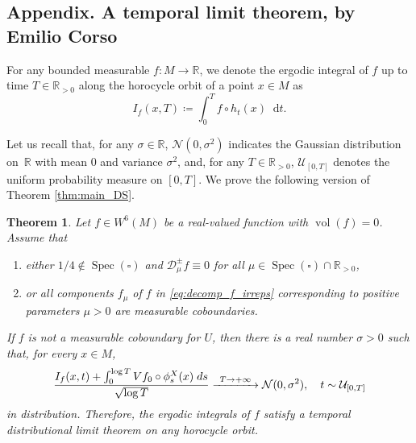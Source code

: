\documentclass[11pt]{article}
\newenvironment{enumeratea}
{\bgroup\def\theenumi{\alph{enumi}}\begin{enumerate}}
{\end{enumerate}\egroup}
\newcommand\To[1]{\mathchoice{\xrightarrow{\kern4pt#1\kern3pt}}{\stackrel{#1}{\longrightarrow}}{}{}}
\newcommand \R{\mathbb{R}}
\newcommand {\cN}{\mathcal{N}}
\newcommand*{\diff}{\mathop{}\!\mathrm{d}}
\newcommand{\Dpm}[1]{\mathcal{D}_\mu^{\pm} #1}
\DeclareMathOperator{\vol}{vol}
\DeclareMathOperator{\Spec}{Spec}
\newtheorem{theorem}{Theorem}
\theoremstyle{definition}
\begin{document}
\begin{appendix}
\let\oldthefootnote\thefootnote
\renewcommand{\thefootnote}{*}
\section*{Appendix. A temporal limit theorem, by Emilio Corso\texorpdfstring{\protect\footnotemark}{fn}}

\setcounter{footnote}{0}
\let\thefootnote\oldthefootnote

For any bounded measurable $f\colon M\to \R$, we denote the ergodic integral of $f$ up to time $T\in \R_{>0}$ along the horocycle orbit of a point $x\in M$ as
\begin{equation*}
I_f(x,T)\coloneqq\int_0^{T}f\circ h_t(x)\diff t.
\end{equation*}

Let us recall that, for any $\sigma\in \R$, $\cN(0,\sigma^{2})$ indicates the Gaussian distribution on~$\R$ with mean $0$ and variance $\sigma^{2}$, and, for any $T\in \R_{>0}$, $\mathcal{U}_{[0,T]}$ denotes the uniform probability measure on $[0,T]$.
We prove the following version of Theorem \ref{thm:main_DS}.

\begin{theorem}
\label{temporalDLT}
Let $f \in W^6(M)$ be a real-valued function with $\vol(f)=0$.
Assume that
\begin{enumeratea}
\item\label{temporalDLTa}
either $1/4 \notin \Spec(\square)$ and $\Dpm{f} \equiv 0$ for all $\mu \in \Spec(\square) \cap \R_{>0}$,
\item\label{temporalDLTb}
or all components $f_\mu$ of $f$ in \eqref{eq:decomp_f_irreps} corresponding to positive parameters $\mu >0$ are measurable coboundaries.
\end{enumeratea}
If $f$ is not a measurable coboundary for $U$, then there is a real number $\sigma>0$ such that, for every $x \in M$,
\begin{equation}
\label{distrlimit}
\frac{I_f(x,t)+\int_0^{\log{T}}Vf_0\circ\phi^{X}_s(x)\;\emph{d}s}{\sqrt{\log{T}}}\To{T\to+\infty}\cN(0,\sigma^{2}), \quad t\sim \mathcal{U}_{[0,T]}
\end{equation}
in distribution. Therefore, the ergodic integrals of $f$ satisfy a temporal distributional limit theorem on any horocycle orbit.
\end{theorem}


\end{appendix}
\end{document}
